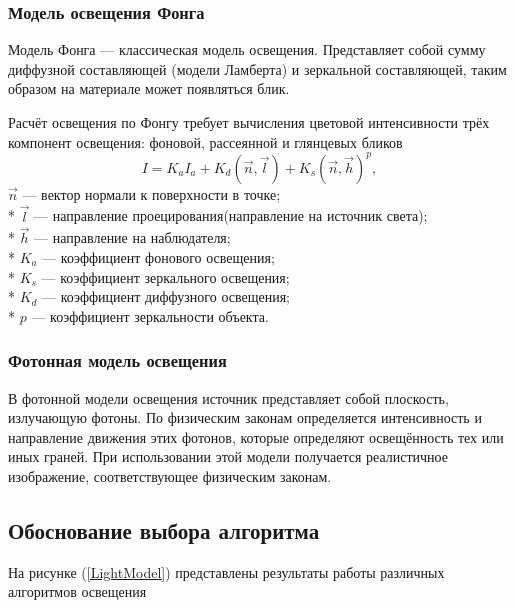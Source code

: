 \documentclass[14pt,a4paper]{extarticle}
\begin{document}
   	 	\subsubsection*{Модель освещения Фонга}
	    	Модель Фонга --- классическая модель освещения. 
	    	Представляет собой сумму диффузной составляющей (модели Ламберта) и зеркальной составляющей, 
	    	таким образом на материале может появляться блик.
	    
	    	Расчёт освещения по Фонгу требует вычисления цветовой интенсивности трёх компонент освещения: фоновой, рассеянной и глянцевых бликов
	    	\begin{equation*}
	    		I = K_aI_a + K_d(\vec{n}, \vec{l}) + K_s(\vec{n},\vec{h})^p,
	    	\end{equation*}
	     	$\vec{n}$ --- вектор нормали к поверхности в точке;\\*
	     	$\vec{l}$ --- направление проецирования(направление на источник света);\\*
	     	$\vec{h}$ --- направление на наблюдателя;\\*
	     	$K_a$ --- коэффициент фонового освещения;\\*
	     	$K_s$ --- коэффициент зеркального освещения;\\*
	     	$K_d$ --- коэффициент диффузного освещения;\\*
	     	$p$ --- коэффициент зеркальности объекта.
	    
    
    	\subsubsection*{Фотонная модель освещения}
    		В фотонной модели освещения источник представляет собой плоскость, излучающую фотоны. 
    		По физическим законам определяется интенсивность и направление движения этих фотонов, 
    		которые определяют освещённость тех или иных граней. 
    		При использовании этой модели получается реалистичное изображение, соответствующее физическим законам.
    		
    \subsection{Обоснование выбора алгоритма} 
    	На рисунке (\ref{LightModel}) представлены результаты работы различных алгоритмов освещения
    	
\end{document}

